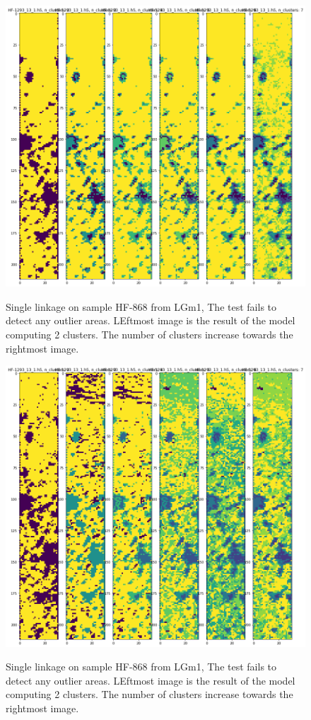 \documentclass[a4paper, 12pt, oneside]{book}
\begin{document}
\begin{appendices}
\begin{figure}[H]
    \centering
{\includegraphics[width=15cm]{images/Ward_linkage/LGm-1/HF-1293_13_1.h5_1.png} }
\caption{Single linkage on sample HF-868 from LGm1, The test fails to detect any outlier areas. LEftmost image is the result of the model computing 2 clusters. The number of clusters increase towards the rightmost image.\label{fig:SL_HF868}}%

\end{figure}


\begin{figure}[H]

    \centering
{\includegraphics[width=15cm]{images/KMeans_full/LGm-1/HF-1293_13_1.h5_1.png} }
\caption{Single linkage on sample HF-868 from LGm1, The test fails to detect any outlier areas. LEftmost image is the result of the model computing 2 clusters. The number of clusters increase towards the rightmost image.\label{fig:SL_HF868}}%


\end{figure}
\end{appendices}
\end{document}
